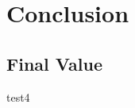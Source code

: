 
\chapter{Conclusion}
\label{chapter:Conclusion}
\thispagestyle{myheadings} %

\section{Final Value}
\label{sec:FinalValue}

test4
